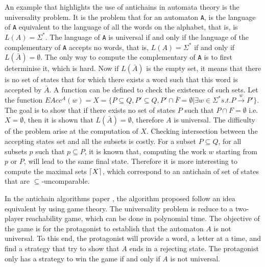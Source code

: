 \documentclass[letterpaper]{article}
\DeclarePairedDelimiter{\ceil}{\lceil}{\rceil}
\begin{document}
An example that highlights the use of antichains in automata theory is
the universality problem. It is the problem that for an automaton
\texttt{A}, is the language of \texttt{A} equivalent to the language
of all the words on the alphabet, that is, is $L(A) = \Sigma^*$.
The language of \texttt{A} is universal if and only if the language
of the complementary of \texttt{A} accepts no words, that is,
$L(A) = \Sigma^*$ if and only if $L(\bar{A}) = \emptyset$.
The only way to compute the complementary of \texttt{A} is to first
determinise it, which is hard. Now if $L(\bar{A})$ is the empty set,
it means that there is no set of states that for which there exists a word
such that this word is accepted by $\bar{A}$. A function can be
defined to check the existence of such sets. Let the function
$EAcc^A(w) = X
= \{ P \subseteq Q, P' \subseteq Q, P' \cap \bar{F} = \emptyset
| \exists w \in \Sigma^* s.t. P \xrightarrow{w} P'\}$.
The goal is to show that if there exists
no set of states $P$ such that $P \cap F = \emptyset$ i.e.
$X = \emptyset$, then it is shown that $L(\bar{A}) = \emptyset$, therefore
$A$ is universal. The difficulty of the problem arise at the computation
of $X$. Checking intersection between the accepting states set and all
the subsets is costly.
For a subset $P \subseteq Q$, for all subsets $p$ such that $p \subseteq P$,
it is known that, computing the work $w$ starting from $p$ or $P$, will lead
to the same final state. Therefore it is more interesting to compute
the maximal sets $\ceil{X}$, which correspond to an antichain of set of
states that are $\subseteq$-uncomparable.

In the antichain algorithms paper
\cite{AC_universality}, the algorithm proposed follow an idea equivalent
by using game theory. The universality problem is reduce to
a two-player reachability game, which can be done in polynomial time.
The objective of the game is for the protagonist to establish that
the automaton $A$ is not universal. To this end, the protagonist will
provide a word, a letter at a time, and find a strategy that try
to show that $A$ ends in a rejecting state.
The protagonist only has a strategy to win the game if and only if $A$ is
not universal.

\end{document}
